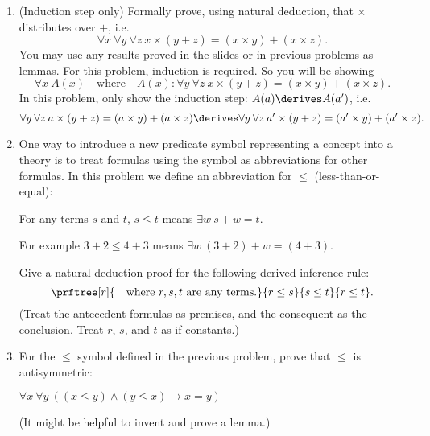 \documentclass{cs81-homework}
\begin{document}
\begin{enumerate}
  \begin{solution}
  \end{solution}

\item {} (Induction step only) Formally prove, using natural deduction,
  that \(\times\) distributes over \(+\), i.e.
  \[
    \forall x \: \forall y \: \forall z \: x \times (y + z) = (x \times y) + (x \times z).
  \]
  You may use any results proved in the slides or in previous problems as lemmas.
  For this problem, induction is required.  So you will be showing
  \[
    \forall x \: A(x) \quad \text{where} \quad A(x)\colon \forall y \: \forall z
    \: x \times (y + z) = (x \times y) + (x \times z).
  \]
  In this problem, only show the induction step: \(A(a) \derives A(a')\), i.e.
  \[
    \forall y \: \forall z \: a \times (y + z) = (a \times y) + (a \times z)
    \derives \forall y \: \forall z \: a' \times (y + z) = (a' \times y) + (a'
    \times z).
  \]

  \begin{solution}
  \end{solution}

\item {} One way to introduce a new predicate symbol representing a
  concept into a theory is to treat formulas using the symbol as abbreviations
  for other formulas.  In this problem we define an abbreviation for \(\le\)
  (less-than-or-equal):
  
  For any terms \(s\) and \(t\), \(s \le t\) means \(\exists w \: s+w = t\).
  
  For example \(3+2 \le 4+3\) means \(\exists w \: (3+2)+w = (4+3)\).
        
  Give a natural deduction proof for the following derived inference rule:
  \[
    \prftree[r]{\quad\text{where \(r, s, t\) are any terms.}}{r \le s}{s \le
      t}{r \le t}.
  \]
  (Treat the antecedent formulas as premises, and the consequent as the
  conclusion. Treat \(r\), \(s\), and \(t\) as if constants.)

  \begin{solution}
  \end{solution}

\item {} For the \(\le\) symbol defined in the previous problem, prove
  that \(\le\) is antisymmetric:

  \(\forall x \: \forall y \: ((x \le y) \land (y \le x) \to x = y)\)

  (It might be helpful to invent and prove a lemma.)
  
  \begin{solution}
  \end{solution}

\end{enumerate}
\end{document}
